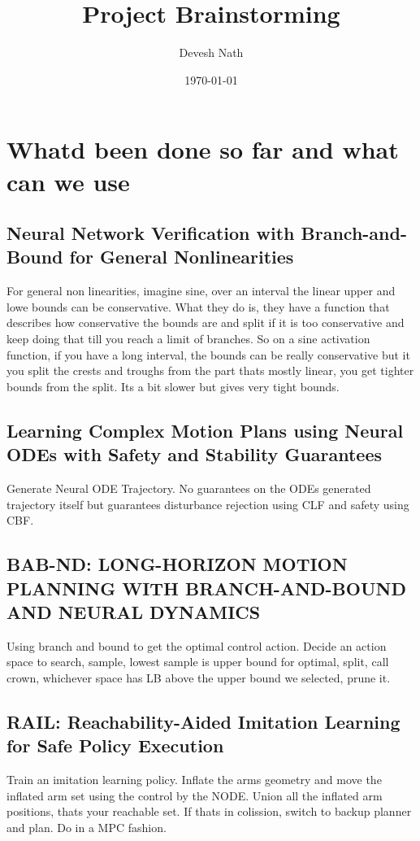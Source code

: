 \documentclass[12pt]{article}
\begin{document}
\title{Project Brainstorming}
\author{Devesh Nath}
\date{\today}

\maketitle
\section{Whatd been done so far and what can we use}
\subsection{Neural Network Verification with Branch-and-Bound for General Nonlinearities}
For general non linearities, imagine sine, over an interval the linear upper and lowe bounds can be conservative. What they do is, they have a function that describes how conservative the bounds are and split if it is too conservative and keep doing that till you reach a limit of branches. So on a sine activation function, if you have a long interval,
the bounds can be really conservative but it you split the crests and troughs from the part thats mostly linear, you get tighter bounds from the split. Its a bit slower but gives very tight bounds. 

\subsection{Learning Complex Motion Plans using Neural ODEs with Safety and Stability Guarantees}
Generate Neural ODE Trajectory. No guarantees on the ODEs generated trajectory itself but guarantees disturbance rejection using CLF and safety using CBF.

\subsection{BAB-ND: LONG-HORIZON MOTION PLANNING WITH BRANCH-AND-BOUND AND NEURAL DYNAMICS}
Using branch and bound to get the optimal control action. Decide an action space to search, sample, lowest sample is upper bound for optimal, split, call crown, whichever space has LB above the upper bound we selected, prune it.

\subsection{RAIL: Reachability-Aided Imitation Learning for Safe Policy Execution}
Train an imitation learning policy. Inflate the arms geometry and move the inflated arm set using the control by the NODE. Union all the inflated arm positions, thats your reachable set. If thats in colission, switch to backup planner and plan. Do in a MPC fashion.
\end{document}
